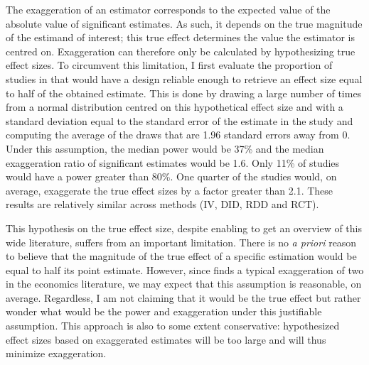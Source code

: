 \documentclass[usletter, 12pt]{article}
\begin{document}
			The exaggeration of an estimator corresponds to the expected value of the absolute value of significant estimates. As such, it depends on the true magnitude of the estimand of interest; this true effect determines the value the estimator is centred on. Exaggeration can therefore only be calculated by hypothesizing true effect sizes. 
			To circumvent this limitation, I first evaluate the proportion of studies in \cite{brodeur_methods_2020} that would have a design reliable enough to retrieve an effect size equal to half of the obtained estimate. This is done by drawing a large number of times from a normal distribution centred on this hypothetical effect size and with a standard deviation equal to the standard error of the estimate in the study and computing the average of the draws that are 1.96 standard errors away from 0. Under this assumption, the median power would be 37\% and the median exaggeration ratio of significant estimates would be 1.6. Only 11\% of studies would have a power greater than 80\%. One quarter of the studies would, on average, exaggerate the true effect sizes by a factor greater than 2.1. These results are relatively similar across methods (IV, DID, RDD and RCT). 
			
			This hypothesis on the true effect size, despite enabling to get an overview of this wide literature, suffers from an important limitation. There is no \textit{a priori} reason to believe that the magnitude of the true effect of a specific estimation would be equal to half its point estimate. However, since \cite{ioannidis_power_2017} finds a typical exaggeration of two in the economics literature, we may expect that this assumption is reasonable, on average. Regardless,  I am not claiming that it would be the true effect but rather wonder what would be the power and exaggeration under this justifiable assumption. This approach is also to some extent conservative: hypothesized effect sizes based on exaggerated estimates will be too large and will thus minimize exaggeration.
			
\end{document}
